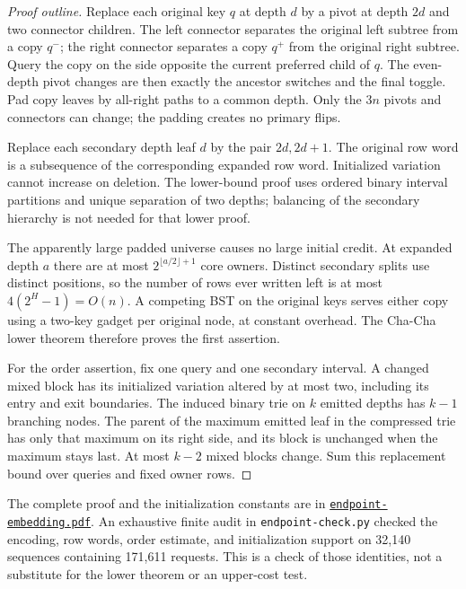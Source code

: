 \documentclass[11pt]{article}
\begin{document}
\begin{proof}[Proof outline]
Replace each original key $q$ at depth $d$ by a pivot at depth $2d$
and two connector children. The left connector separates the original
left subtree from a copy $q^-$; the right connector separates a copy
$q^+$ from the original right subtree. Query the copy on the side
opposite the current preferred child of $q$. The even-depth pivot
changes are then exactly the ancestor switches and the final toggle.
Pad copy leaves by all-right paths to a common depth. Only the $3n$
pivots and connectors can change; the padding creates no primary flips.

Replace each secondary depth leaf $d$ by the pair $2d,2d+1$.
The original row word is a subsequence of the corresponding expanded
row word. Initialized variation cannot increase on deletion.
The lower-bound proof uses ordered binary interval partitions and
unique separation of two depths; balancing of the secondary hierarchy
is not needed for that lower proof.

The apparently large padded universe causes no large initial credit.
At expanded depth $a$ there are at most
$2^{\lfloor a/2\rfloor+1}$ core owners. Distinct secondary splits use
distinct positions, so the number of rows ever written left is at most
$4(2^H-1)=O(n)$. A competing BST on the original keys serves either
copy using a two-key gadget per original node, at constant overhead.
The Cha-Cha lower theorem therefore proves the first assertion.

For the order assertion, fix one query and one secondary interval.
A changed mixed block has its initialized variation altered by at
most two, including its entry and exit boundaries. The induced binary
trie on $k$ emitted depths has $k-1$ branching nodes. The parent of
the maximum emitted leaf in the compressed trie has only that maximum
on its right side, and its block is unchanged
when the maximum stays last. At most $k-2$ mixed blocks change.
Sum this replacement bound over queries and fixed owner rows.
\end{proof}

The complete proof and the initialization constants are in
\href{endpoint-embedding.pdf}{\texttt{endpoint-embedding.pdf}}.
An exhaustive finite audit in \texttt{endpoint-check.py} checked the
encoding, row words, order estimate, and initialization support on
32,140 sequences containing 171,611 requests. This is a check of those
identities, not a substitute for the lower theorem or an upper-cost test.
\end{document}
